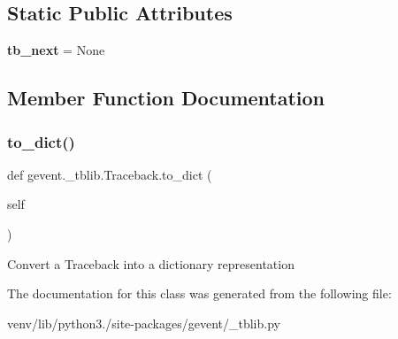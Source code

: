 \subsection*{Static Public Attributes}
\begin{DoxyCompactItemize}
\item 
\mbox{\label{classgevent_1_1__tblib_1_1_traceback_afb700fb8024342aefbfbee48c702b6d6}} 
{\bfseries tb\+\_\+next} = None
\end{DoxyCompactItemize}


\subsection{Member Function Documentation}
\mbox{\label{classgevent_1_1__tblib_1_1_traceback_aeada2e87f56ed4cc3de57afb34049ad5}} 
\subsubsection{\texorpdfstring{to\+\_\+dict()}{to\_dict()}}
{\footnotesize\ttfamily def gevent.\+\_\+tblib.\+Traceback.\+to\+\_\+dict (\begin{DoxyParamCaption}\item[{}]{self }\end{DoxyParamCaption})}

\begin{DoxyVerb}Convert a Traceback into a dictionary representation\end{DoxyVerb}
 

The documentation for this class was generated from the following file\+:\begin{DoxyCompactItemize}
\item 
venv/lib/python3./site-\/packages/gevent/\+\_\+tblib.\+py\end{DoxyCompactItemize}
